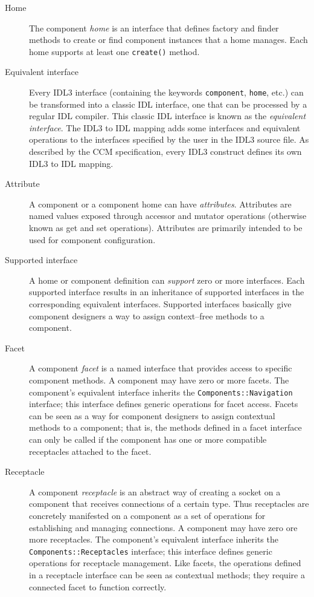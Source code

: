 \begin{description}
\item [Home]
The component {\it home} is an interface that defines factory and finder methods
to create or find component instances that a home manages. Each home supports
at least one {\tt create()} method.

\item [Equivalent interface]
Every IDL3 interface (containing the keywords {\tt component}, {\tt home}, etc.)
can be transformed into a classic IDL interface, one that can be processed by a
regular IDL compiler. This classic IDL interface is known as the {\it equivalent
interface\/}. The IDL3 to IDL mapping adds some interfaces and equivalent
operations to the interfaces specified by the user in the IDL3 source file. As
described by the CCM specification, every IDL3 construct defines its own IDL3 to
IDL mapping.

\item [Attribute]
A component or a component home can have {\it attributes\/}. Attributes are
named values exposed through accessor and mutator operations (otherwise known as
get and set operations). Attributes are primarily intended to be used for
component configuration.

\item [Supported interface]
A home or component definition can {\it support} zero or more interfaces. Each
supported interface results in an inheritance of supported interfaces in the
corresponding equivalent interfaces. Supported interfaces basically give
component designers a way to assign context--free methods to a component.

\item [Facet]
A component {\it facet} is a named interface that provides access to specific
component methods. A component may have zero or more facets. The component's
equivalent interface inherits the {\tt Components::Navigation} interface; this
interface defines generic operations for facet access. Facets can be seen as a
way for component designers to assign contextual methods to a component; that
is, the methods defined in a facet interface can only be called if the component
has one or more compatible receptacles attached to the facet.

\item [Receptacle]
A component {\it receptacle} is an abstract way of creating a socket on a
component that receives connections of a certain type. Thus receptacles are
concretely manifested on a component as a set of operations for establishing and
managing connections. A component may have zero ore more receptacles. The
component's equivalent interface inherits the {\tt Components::Receptacles}
interface; this interface defines generic operations for receptacle management.
Like facets, the operations defined in a receptacle interface can be seen as
contextual methods; they require a connected facet to function correctly.


\end{description}
